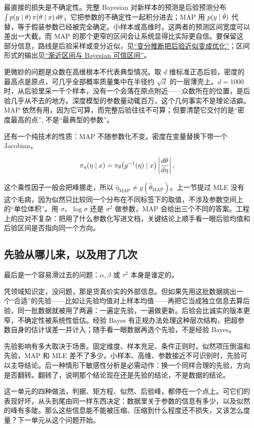 最直接的损失是不确定性。完整 Bayesian 对新样本的预测是后验预测分布 \(\int p(y\mid\theta)\,\pi(\theta\mid x)\,d\theta\)，它把参数的不确定性一起积分进去；MAP 用 \(p(y\mid\hat\theta)\) 代替，等于假装参数已经被完全确定。小样本或高维时，这两者的预测区间宽度可以差出一大截，而 MAP 的那个更窄的区间会让系统显得比实际更自信。要保留这部分信息，路线是后验采样或变分近似，见\hyperref[sec:13-Machine-Learning/08-Sampling-and-Inference/03]{``变分推断把后验近似变成优化''}；区间形式的输出见\hyperref[sec:11-Mathematical-Statistics/04-Interval-Estimation/03]{``渐近区间与 Bayesian 可信区间''}。

更微妙的问题是众数在高维根本不代表典型情况。取 \(d\) 维标准正态后验，密度的最高点是原点，可几乎全部概率质量集中在半径约 \(\sqrt d\) 的一层薄壳上。\(d=1000\) 时，从后验里采一千个样本，没有一个会落在原点附近——众数所在的位置，是后验几乎从不去的地方。深度模型的参数量动辄百万，这个几何事实不是理论洁癖。MAP 依然有用，因为它可算，而完整后验往往不可算；但要清楚它交付的是``密度最高的点'', 不是``最典型的参数''。

还有一个纯技术的性质：MAP 不随参数化不变。密度在变量替换下带一个 Jacobian，

\[
\pi_\eta(\eta\mid x)=\pi_\theta\bigl(g^{-1}(\eta)\mid x\bigr)\left|\frac{d\theta}{d\eta}\right|,
\]

这个乘性因子一般会把峰挪走，所以 \(\hat\eta_{\mathrm{MAP}}\ne g(\hat\theta_{\mathrm{MAP}})\)。上一节提过 MLE 没有这个毛病，因为似然只比较同一个分布在不同标签下的取值，不涉及参数空间上的``单位体积''。用 \(\sigma\)、\(\log\sigma\) 还是 \(\sigma^2\) 做参数，MAP 会给出三个不同的答案。工程上的应对不复杂：把用了什么参数化写进文档，关键结论上顺手看一眼后验均值和后验区间是否指向同一个方向。

\subsection{先验从哪儿来，以及用了几次}

最后是一个容易滑过去的问题：\(\alpha,\beta\) 或 \(\tau^2\) 本身是谁定的。

凭领域知识定，没问题，那是货真价实的外部信息。但如果先用这批数据挑出一个``合适''的先验——比如让先验均值对上样本均值——再把它当成独立信息去算后验，同一批数据就被用了两遍：一遍定先验，一遍做更新。后验会比诚实的版本更窄，不确定性被系统性低估。经验 Bayes 有正规办法处理这种层次结构，把超参数自身的估计误差一并计入；随手看一眼数据再选个先验，不是经验 Bayes。

先验影响有多大取决于场景。固定维度、样本充足、条件正则时，似然项压倒温和先验，MAP 和 MLE 差不了多少。小样本、高维、参数接近不可识别时，先验可以主导结论。后一种情形下敏感性分析是必需动作：换一个同样合理的先验，方向是否翻转。翻转了，说明那个结论现在还是先验的结论，不是数据的结论。

这一单元的四种做法，判据、矩方程、似然、后验峰，都停在一个点上。可它们的表现好坏，从头到尾由同一样东西决定：数据里关于参数的信息有多少，以及似然的峰有多陡。那么这些信息能不能被压缩、压缩到什么程度还不损失，又该怎么度量？下一单元从这个问题开始。
